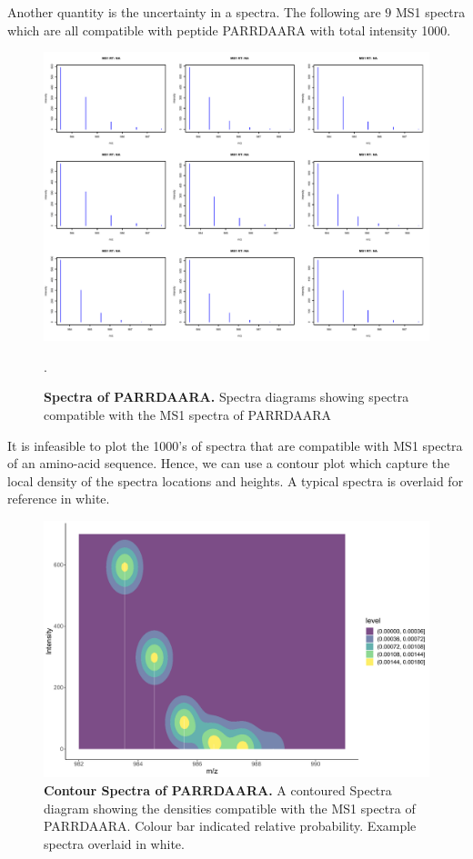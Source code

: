 \documentclass[12pt,english, journal=jpr, layout=twocolumn]{article}
\begin{document}
Another quantity is the uncertainty in a spectra. The following are $9$ MS1 spectra which are all compatible with peptide PARRDAARA with total intensity 1000.
	
\begin{figure}[H]
	\centering
	\includegraphics[width =1\textwidth]{aaMS1example.pdf}
	\caption{\textbf{Spectra of PARRDAARA.} Spectra diagrams showing spectra compatible with the MS1 spectra of PARRDAARA}.
	\label{figure::figure2spectraexample}
\end{figure}

It is infeasible to plot the 1000's of spectra that are compatible with MS1 spectra of an amino-acid sequence. Hence, we can use a contour plot which capture the local density of the spectra locations and heights. A typical spectra is overlaid for reference in white.

 \begin{figure}[H]
 	\centering
 	\includegraphics[width =1\textwidth]{spectrauncertaintyplot.pdf}
 	\caption{\textbf{Contour Spectra of PARRDAARA.} A contoured Spectra diagram showing the densities compatible with the MS1 spectra of PARRDAARA. Colour bar indicated relative probability. Example spectra overlaid in white.}
 	\label{figure::figure3spectrauncertaintyplot}
 \end{figure}

	
\end{document}
